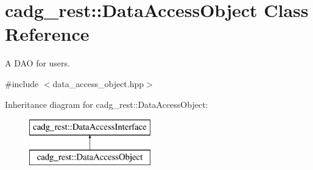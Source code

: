 \hypertarget{classcadg__rest_1_1_data_access_object}{}\section{cadg\+\_\+rest\+::Data\+Access\+Object Class Reference}
\label{classcadg__rest_1_1_data_access_object}


A D\+AO for users.  




{\ttfamily \#include $<$data\+\_\+access\+\_\+object.\+hpp$>$}

Inheritance diagram for cadg\+\_\+rest\+::Data\+Access\+Object\+:\begin{figure}[H]
\begin{center}
\leavevmode
\includegraphics[height=2.000000cm]{classcadg__rest_1_1_data_access_object}
\end{center}
\end{figure}
